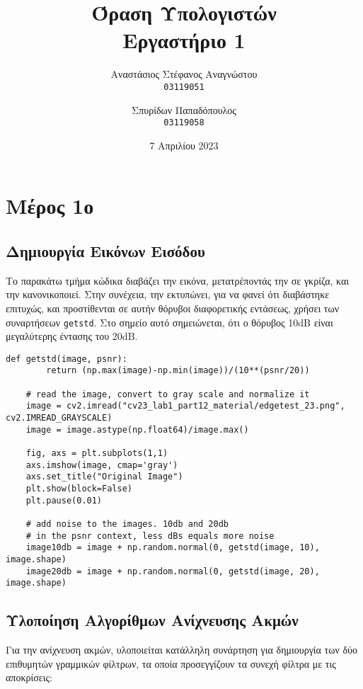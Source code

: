\documentclass{article}
\title{Όραση Υπολογιστών\\
        \large Εργαστήριο 1}
\author{Αναστάσιος Στέφανος Αναγνώστου\\
    \texttt{03119051}
        \and
        Σπυρίδων Παπαδόπουλος\\
    \texttt{03119058}}
\date{7 Απριλίου 2023}
\newcommand{\eng}[1]{\foreignlanguage{english}{#1}}
\begin{document}
\maketitle

\section{Μέρος 1ο}

\subsection{Δημιουργία Εικόνων Εισόδου}

Το παρακάτω τμήμα κώδικα διαβάζει την εικόνα, μετατρέποντάς την σε γκρίζα, και την κανονικοποιεί. Στην συνέχεια, την εκτυπώνει, για να φανεί ότι διαβάστηκε επιτυχώς, και προστίθενται σε αυτήν θόρυβοι διαφορετικής εντάσεως, χρήσει των συναρτήσεων \eng{\texttt{getstd}}. Στο σημείο αυτό σημειώνεται, ότι ο θόρυβος 10\eng{dB} είναι μεγαλύτερης έντασης του 20\eng{dB}.

\begin{lstlisting}[breaklines=true, showstringspaces=false]
    def getstd(image, psnr):
        return (np.max(image)-np.min(image))/(10**(psnr/20))

    # read the image, convert to gray scale and normalize it
    image = cv2.imread("cv23_lab1_part12_material/edgetest_23.png", cv2.IMREAD_GRAYSCALE)
    image = image.astype(np.float64)/image.max()

    fig, axs = plt.subplots(1,1)
    axs.imshow(image, cmap='gray')
    axs.set_title("Original Image")
    plt.show(block=False)
    plt.pause(0.01)

    # add noise to the images. 10db and 20db
    # in the psnr context, less dBs equals more noise
    image10db = image + np.random.normal(0, getstd(image, 10), image.shape)
    image20db = image + np.random.normal(0, getstd(image, 20), image.shape)
\end{lstlisting}

\subsection{Υλοποίηση Αλγορίθμων Ανίχνευσης Ακμών}

Για την ανίχνευση ακμών, υλοποιείται κατάλληλη συνάρτηση για δημιουργία των δύο επιθυμητών γραμμικών φίλτρων, τα οποία προσεγγίζουν τα συνεχή φίλτρα με τις αποκρίσεις:
\end{document}
